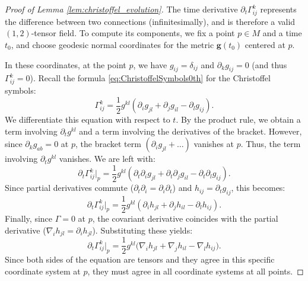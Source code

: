 \documentclass[11pt]{article}
\theoremstyle{plain}
\theoremstyle{definition}
\theoremstyle{remark}
\begin{document}
\begin{proof}[Proof of Lemma \ref{lem:christoffel_evolution}]
    The time derivative $\partial_t \Gamma_{ij}^k$ represents the difference between two connections (infinitesimally), and is therefore a valid $(1,2)$-tensor field. To compute its components, we fix a point $p \in M$ and a time $t_0$, and choose geodesic normal coordinates for the metric $\mathbf{g}(t_0)$ centered at $p$.
    
    In these coordinates, at the point $p$, we have $g_{ij} = \delta_{ij}$ and $\partial_k g_{ij} = 0$ (and thus $\Gamma_{ij}^k = 0$).
    Recall the formula \eqref{eq:ChristoffelSymbols0th} for the Christoffel symbols:
    \begin{equation}\label{eq:ChristoffelSymbols}
        \Gamma_{ij}^k = \frac{1}{2} g^{kl} \left( \partial_i g_{jl} + \partial_j g_{il} - \partial_l g_{ij} \right).
    \end{equation}
    We differentiate this equation with respect to $t$. By the product rule, we obtain a term involving $\partial_t g^{kl}$ and a term involving the derivatives of the bracket.
    However, since $\partial_k g_{ab} = 0$ at $p$, the bracket term $(\partial_i g_{jl} + \dots)$ vanishes at $p$. Thus, the term involving $\partial_t g^{kl}$ vanishes. We are left with:
    \begin{equation*}
        \partial_t \Gamma_{ij}^k \bigg|_p = \frac{1}{2} g^{kl} \left( \partial_t \partial_i g_{jl} + \partial_t \partial_j g_{il} - \partial_t \partial_l g_{ij} \right).
    \end{equation*}
    Since partial derivatives commute ($\partial_t \partial_i = \partial_i \partial_t$) and $h_{ij} = \partial_t g_{ij}$, this becomes:
    \begin{equation*}
        \partial_t \Gamma_{ij}^k \bigg|_p = \frac{1}{2} g^{kl} \left( \partial_i h_{jl} + \partial_j h_{il} - \partial_l h_{ij} \right).
    \end{equation*}
    Finally, since $\Gamma=0$ at $p$, the covariant derivative coincides with the partial derivative ($\nabla_i h_{jl} = \partial_i h_{jl}$). Substituting these yields:
    \begin{equation*}
        \partial_t \Gamma_{ij}^k \bigg|_p = \frac{1}{2} g^{kl} \big( \nabla_i h_{jl} + \nabla_j h_{il} - \nabla_l h_{ij} \big).
    \end{equation*}
    Since both sides of the equation are tensors and they agree in this specific coordinate system at $p$, they must agree in all coordinate systems at all points.
\end{proof}
\end{document}
